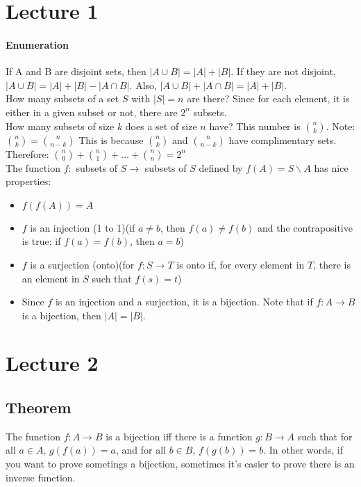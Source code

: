 \documentclass[10pt,letter]{article}
\begin{document}
\section*{Lecture 1}

\paragraph{Enumeration} If A and B are disjoint sets, then $|A\cup B|=|A|+|B|$. If they are not disjoint, $|A\cup B| =|A|+|B|-|A\cap B|$. Also, $|A\cup B|+|A\cap B|=|A|+|B|$. \\ 
How many subsets of a set $S$ with $|S|=n$ are there? Since for each element, it is either in a given subset or not, there are $2^n$ subsets. \\ 
How many subsets of size $k$ does a set of size $n$ have? This number is ${n\choose k}$. Note: ${n\choose k}={n\choose n-k}$ This is because ${n\choose k}$ and ${n\choose n-k}$ have complimentary sets. \\ 
Therefore: ${n\choose 0} + {n\choose 1}+\ldots+{n\choose n}=2^n$ \\ 
The function $f:$ subsets of $S\rightarrow$ subsets of $S$ defined by $f(A)=S\backslash A$ has nice properties: 
\begin{itemize}
    \item $f(f(A))=A$ 
    \item $f$ is an injection (1 to 1)(if $a\neq b$, then $f(a)\neq f(b)$ and the contrapositive is true: if $f(a)=f(b)$, then $a=b$)
    \item $f$ is a surjection (onto)(for $f:S\rightarrow T$ is onto if, for every element in $T$, there is an element in $S$ such that $f(s)=t$) 
    \item Since $f$ is an injection and a surjection, it is a bijection. Note that if $f:A\rightarrow B$ is a bijection, then $|A|=|B|$. 
\end{itemize}

\section*{Lecture 2}
\subsection*{Theorem} The function $f:A\rightarrow B$ is a bijection iff there is a function $g:B\rightarrow A$ such that for all $a\in A$, $g(f(a))=a$, and for all $b\in B$, $f(g(b))=b$. In other words, if you want to prove sometings a bijection, sometimes it's easier to prove there is an inverse function. 
\end{document}
